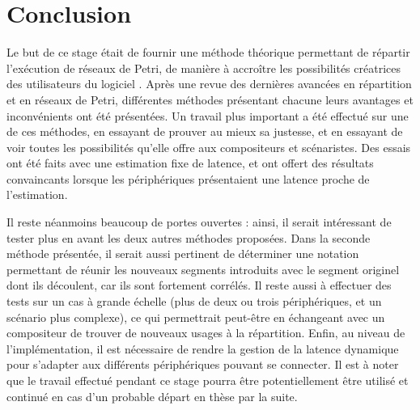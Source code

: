 \chapter*{Conclusion}
Le but de ce stage était de fournir une méthode théorique permettant de répartir l'exécution de réseaux de Petri, de manière à accroître les possibilités créatrices des utilisateurs du logiciel . Après une revue des dernières avancées en répartition et en réseaux de Petri, différentes méthodes présentant chacune leurs avantages et inconvénients ont été présentées. Un travail plus important a été effectué sur une de ces méthodes, en essayant de prouver au mieux sa justesse, et en essayant de voir toutes les possibilités qu'elle offre aux compositeurs et scénaristes. Des essais ont été faits avec une estimation fixe de latence, et ont offert des résultats convaincants lorsque les périphériques présentaient une latence proche de l'estimation.

Il reste néanmoins beaucoup de portes ouvertes : ainsi, il serait intéressant de tester plus en avant les deux autres méthodes proposées. Dans la seconde méthode présentée, il serait aussi pertinent de déterminer une notation permettant de réunir les nouveaux segments introduits avec le segment originel dont ils découlent, car ils sont fortement corrélés.
Il reste aussi à effectuer des tests sur un cas à grande échelle (plus de deux ou trois périphériques, et un scénario plus complexe), ce qui permettrait peut-être en échangeant avec un compositeur de trouver de nouveaux usages à la répartition. Enfin, au niveau de l'implémentation, il est nécessaire de rendre la gestion de la latence dynamique pour s'adapter aux différents périphériques pouvant se connecter.
Il est à noter que le travail effectué pendant ce stage pourra être potentiellement être utilisé et continué en cas d'un probable départ en thèse par la suite.